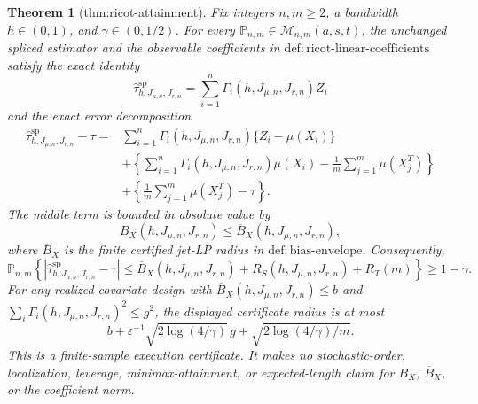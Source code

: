 \documentclass{article}
\newtheorem{theorem}{Theorem}
\begin{document}
\begin{theorem}[thm:ricot-attainment]\label{thm:ricot-attainment}
Fix integers \(n,m\ge2\), a bandwidth \(h\in(0,1)\), and \(\gamma\in(0,1/2)\). For every \(\mathbb P_{n,m}\in\mathcal M_{n,m}(a,s,t)\), the unchanged spliced estimator and the observable coefficients in \(\mathrm{def:ricot\text{-}linear\text{-}coefficients}\) satisfy the exact identity
\[
\widehat\tau^{\mathrm{sp}}_{h,J_{\mu,n},J_{r,n}}=\sum_{i=1}^n\Gamma_i(h,J_{\mu,n},J_{r,n})Z_i
\]
and the exact error decomposition
\[
\begin{aligned}
\widehat\tau^{\mathrm{sp}}_{h,J_{\mu,n},J_{r,n}}-\tau
={}&\sum_{i=1}^n\Gamma_i(h,J_{\mu,n},J_{r,n})\{Z_i-\mu(X_i)\}\\
&+\left\{\sum_{i=1}^n\Gamma_i(h,J_{\mu,n},J_{r,n})\mu(X_i)-\frac1m\sum_{j=1}^m\mu(X_j^T)\right\}\\
&+\left\{\frac1m\sum_{j=1}^m\mu(X_j^T)-\tau\right\}.
\end{aligned}
\]
The middle term is bounded in absolute value by
\[
B_X(h,J_{\mu,n},J_{r,n})\le\overline B_X(h,J_{\mu,n},J_{r,n}),
\]
where \(\overline B_X\) is the finite certified jet-LP radius in \(\mathrm{def:bias\text{-}envelope}\). Consequently,
\[
\mathbb P_{n,m}\!\left\{\left|\widehat\tau^{\mathrm{sp}}_{h,J_{\mu,n},J_{r,n}}-\tau\right|
\le \overline B_X(h,J_{\mu,n},J_{r,n})+R_S(h,J_{\mu,n},J_{r,n})+R_T(m)\right\}\ge1-\gamma.
\]
For any realized covariate design with \(\overline B_X(h,J_{\mu,n},J_{r,n})\le b\) and \(\sum_i\Gamma_i(h,J_{\mu,n},J_{r,n})^2\le g^2\), the displayed certificate radius is at most
\[
b+\varepsilon^{-1}\sqrt{2\log(4/\gamma)}\,g+\sqrt{2\log(4/\gamma)/m}.
\]
This is a finite-sample execution certificate. It makes no stochastic-order, localization, leverage, minimax-attainment, or expected-length claim for \(B_X\), \(\overline B_X\), or the coefficient norm.
\end{theorem}
\end{document}
